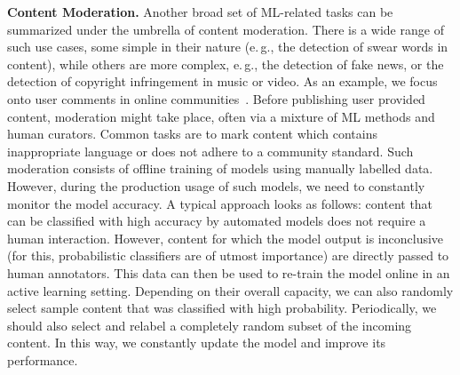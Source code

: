 \documentclass[11pt]{article}
\newcommand{\hdr}[1]{\noindent\textbf{#1.}}
\begin{document}
\hdr{Content Moderation} Another broad set of ML-related tasks can be summarized under the umbrella of content moderation. There is a wide range of such use cases, some simple in their nature (e.\,g., the detection of swear words in content), while others are more complex, e.\,g., the detection of fake news, or the detection of copyright infringement in music or video. As an example, we focus onto user comments in online communities~\cite{contentModeration17}. Before publishing user provided content, moderation might take place, often via a mixture of ML methods and human curators. Common tasks are to mark content which contains inappropriate language or does not adhere to a community standard. Such moderation consists of offline training of models using manually labelled data. However, during the production usage of such models, we need to constantly monitor the model accuracy. A typical approach looks as follows: content that can be classified with high accuracy by automated models does not require a human interaction. However, content for which the model output is inconclusive (for this, probabilistic classifiers are of utmost importance) are directly passed to human annotators. This data can then be used to re-train the model online in an active learning setting. Depending on their overall capacity, we can also randomly select sample content that was classified with high probability. Periodically, we should also select and relabel a completely random subset of the incoming content. In this way, we constantly update the model and improve its performance.\\
\end{document}

